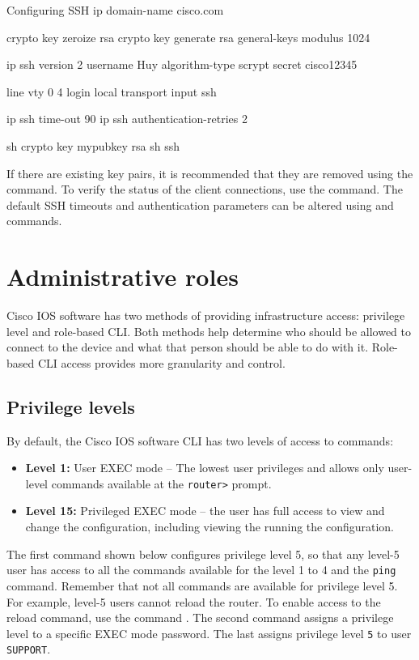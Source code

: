 \begin{sexylisting}{Configuring SSH}
ip domain-name cisco.com

crypto key zeroize rsa
crypto key generate rsa general-keys modulus 1024

ip ssh version 2
username Huy algorithm-type scrypt secret cisco12345

line vty 0 4
  login local
  transport input ssh

ip ssh time-out 90
ip ssh authentication-retries 2

sh crypto key mypubkey rsa
sh ssh
\end{sexylisting}

If there are existing key pairs, it is recommended that they are removed using the  command. To verify the status of the client connections, use the  command. The default SSH timeouts and authentication parameters can be altered using  and  commands.

\section{Administrative roles}

Cisco IOS software has two methods of providing infrastructure access: privilege level and role-based CLI. Both methods help determine who should be allowed to connect to the device and what that person should be able to do with it. Role-based CLI access provides more granularity and control.

\subsection{Privilege levels}

By default, the Cisco IOS software CLI has two levels of access to commands:

\begin{itemize}
\item \textbf{Level 1:} User EXEC mode -- The lowest user privileges and allows only user-level commands available at the \verb|router>| prompt.
\item \textbf{Level 15:} Privileged EXEC mode -- the user has full access to view and change the configuration, including viewing the running the configuration.
\end{itemize}

The first command shown below configures privilege level 5, so that any level-5 user has access to all the commands available for the level 1 to 4 and the \texttt{ping} command. Remember that not all commands are available for privilege level 5. For example, level-5 users cannot reload the router. To enable access to the reload command, use the command . The second command assigns a privilege level to a specific EXEC mode password. The last assigns privilege level \texttt{5} to user \texttt{SUPPORT}. 


